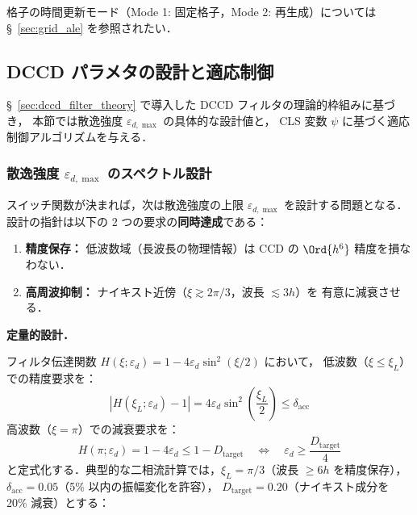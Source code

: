 格子の時間更新モード（Mode 1: 固定格子，Mode 2: 再生成）については
§~\ref{sec:grid_ale} を参照されたい．

\subsection{DCCD パラメタの設計と適応制御}
\label{sec:dccd_params}

§~\ref{sec:dccd_filter_theory} で導入した DCCD フィルタの理論的枠組みに基づき，
本節では散逸強度 $\varepsilon_{d,\max}$ の具体的な設計値と，
CLS 変数 $\psi$ に基づく適応制御アルゴリズムを与える．

\subsubsection{散逸強度 \texorpdfstring{$\varepsilon_{d,\max}$}{ε\_d,max} のスペクトル設計}
\label{sec:dccd_eps_design}

スイッチ関数が決まれば，次は散逸強度の上限 $\varepsilon_{d,\max}$ を設計する問題となる．
設計の指針は以下の 2 つの要求の\textbf{同時達成}である：
\begin{enumerate}[label=(\alph*)]
  \item \textbf{精度保存：} 低波数域（長波長の物理情報）は CCD の $\Ord{h^6}$ 精度を損なわない．
  \item \textbf{高周波抑制：} ナイキスト近傍（$\xi \gtrsim 2\pi/3$，波長 $\lesssim 3h$）を
        有意に減衰させる．
\end{enumerate}

\medskip
\noindent\textbf{定量的設計．}

フィルタ伝達関数 $H(\xi;\varepsilon_d) = 1 - 4\varepsilon_d\sin^2(\xi/2)$ において，
低波数（$\xi \leq \xi_L$）での精度要求を：
\begin{equation}
  |H(\xi_L;\varepsilon_d) - 1| = 4\varepsilon_d\sin^2\!\left(\frac{\xi_L}{2}\right) \leq \delta_\mathrm{acc}
  \label{eq:accuracy_req}
\end{equation}
高波数（$\xi = \pi$）での減衰要求を：
\begin{equation}
  H(\pi;\varepsilon_d) = 1 - 4\varepsilon_d \leq 1 - D_\mathrm{target}
  \quad\Leftrightarrow\quad
  \varepsilon_d \geq \frac{D_\mathrm{target}}{4}
  \label{eq:damping_req}
\end{equation}
と定式化する．典型的な二相流計算では，$\xi_L = \pi/3$（波長 $\geq 6h$ を精度保存），
$\delta_\mathrm{acc} = 0.05$（5\% 以内の振幅変化を許容），
$D_\mathrm{target} = 0.20$（ナイキスト成分を 20\% 減衰）とする：

